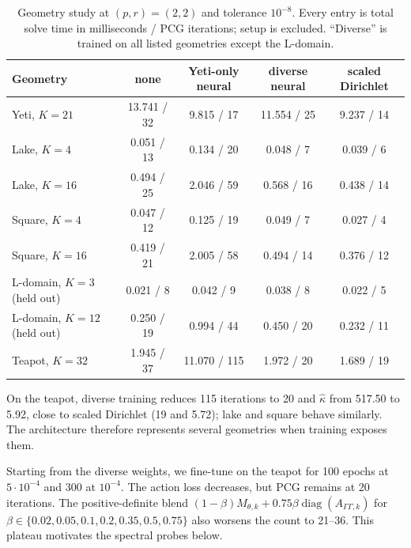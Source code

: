\documentclass{article}
\theoremstyle{plain}
\numberwithin{equation}{section}
\begin{document}
\begin{table}[ht]
    \centering
    \caption{Geometry study at $(p,r)=(2,2)$ and tolerance $10^{-8}$.  Every
        entry is total solve time in milliseconds / PCG iterations; setup is excluded.
        ``Diverse'' is trained on all listed geometries except the L-domain.}
    \label{tab:nn-geometry}
    \small
    \begin{tabular}{lcccc}
        \toprule
        Geometry                    & none        & Yeti-only neural & diverse neural & scaled Dirichlet \\
        \midrule
        Yeti, $K=21$                & 13.741 / 32 & 9.815 / 17       & 11.554 / 25    & 9.237 / 14       \\
        Lake, $K=4$                 & 0.051 / 13  & 0.134 / 20       & 0.048 / 7      & 0.039 / 6        \\
        Lake, $K=16$                & 0.494 / 25  & 2.046 / 59       & 0.568 / 16     & 0.438 / 14       \\
        Square, $K=4$               & 0.047 / 12  & 0.125 / 19       & 0.049 / 7      & 0.027 / 4        \\
        Square, $K=16$              & 0.419 / 21  & 2.005 / 58       & 0.494 / 14     & 0.376 / 12       \\
        L-domain, $K=3$ (held out)  & 0.021 / 8   & 0.042 / 9        & 0.038 / 8      & 0.022 / 5        \\
        L-domain, $K=12$ (held out) & 0.250 / 19  & 0.994 / 44       & 0.450 / 20     & 0.232 / 11       \\
        Teapot, $K=32$              & 1.945 / 37  & 11.070 / 115     & 1.972 / 20     & 1.689 / 19       \\
        \bottomrule
    \end{tabular}
\end{table}

On the teapot, diverse training reduces 115 iterations to 20 and
$\widehat\kappa$ from 517.50 to 5.92, close to scaled Dirichlet (19 and 5.72);
lake and square behave similarly.  The architecture therefore represents
several geometries when training exposes them.

Starting from the diverse weights, we fine-tune on the teapot for 100 epochs
at $5\cdot10^{-4}$ and 300 at $10^{-4}$.  The action loss decreases, but PCG
remains at 20 iterations.  The positive-definite blend
$(1-\beta)M_{\theta,k}+0.75\beta\operatorname{diag}(A_{\Gamma\Gamma,k})$ for
$\beta\in\{0.02,0.05,0.1,0.2,0.35,0.5,0.75\}$ also worsens the count to
21--36.  This plateau motivates the spectral probes below.
\end{document}
